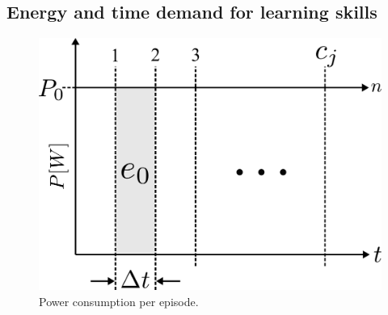 
\subsection{Energy and time demand for learning skills}

\begin{figure}[!ht]
	\centering
	\includegraphics[width=0.9\columnwidth]{fig/power_per_episode.pdf}
	\caption{Power consumption per episode.}
	\label{fig:power_per_episode}
\end{figure}




